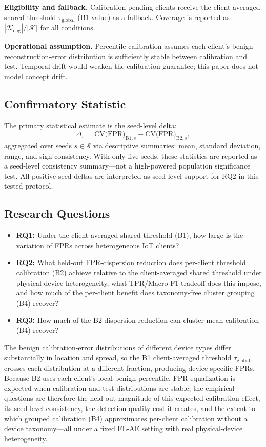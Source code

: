 \textbf{Eligibility and fallback.}
Calibration-pending clients receive the client-averaged shared threshold $\tau_{\text{global}}$ (B1 value) as a fallback. Coverage is reported as $|\mathcal{K}_{\mathrm{elig}}|/|\mathcal{K}|$ for all conditions.

\textbf{Operational assumption.}
Percentile calibration assumes each client's benign reconstruction-error distribution
is sufficiently stable between calibration and test.
Temporal drift would weaken the calibration guarantee; this paper does not model concept drift.

\subsection{Confirmatory Statistic}
The primary statistical estimate is the seed-level delta:
\begin{equation}
  \Delta_s = \text{CV(FPR)}_{\text{B1},s} - \text{CV(FPR)}_{\text{B2},s},
\end{equation}
aggregated over seeds $s \in \mathcal{S}$ via descriptive summaries: mean, standard deviation, range, and sign consistency.
With only five seeds, these statistics are reported as a seed-level consistency summary---not a high-powered
population significance test.
All-positive seed deltas are interpreted as seed-level support
for RQ2 in this tested protocol.

\subsection{Research Questions}
\begin{itemize}
  \item \textbf{RQ1:} Under the client-averaged shared threshold (B1), how large is the variation of FPRs across heterogeneous IoT clients?
  \item \textbf{RQ2:} What held-out FPR-dispersion reduction does per-client threshold calibration (B2) achieve relative to the client-averaged shared threshold under physical-device heterogeneity, what TPR/Macro-F1 tradeoff does this impose, and how much of the per-client benefit does taxonomy-free cluster grouping (B4) recover?
  \item \textbf{RQ3:} How much of the B2 dispersion reduction can cluster-mean calibration (B4) recover?
\end{itemize}

The benign calibration-error distributions of different device types differ substantially
in location and spread, so the B1 client-averaged threshold $\tau_{\text{global}}$ crosses
each distribution at a different fraction, producing device-specific FPRs.
Because B2 uses each client's local benign percentile, FPR equalization is expected
when calibration and test distributions are stable; the empirical questions are therefore
the held-out magnitude of this expected calibration effect, its seed-level consistency,
the detection-quality cost it creates, and the extent to which grouped calibration (B4)
approximates per-client calibration without a device taxonomy---all under a fixed FL-AE
setting with real physical-device heterogeneity.
